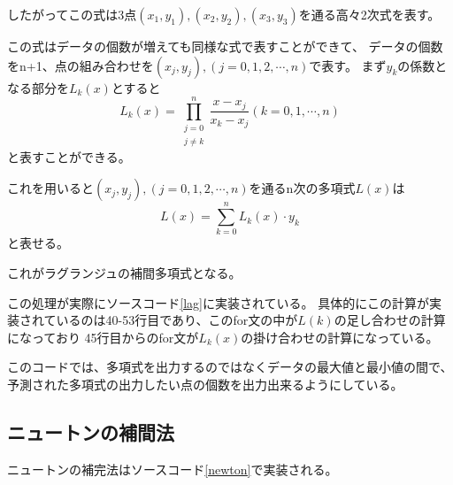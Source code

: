\documentclass[a4paper,11pt,dvipdfmx]{jsarticle}
\begin{document}
したがってこの式は3点$(x_1,y_1),(x_2,y_2),(x_3,y_3)$を通る高々2次式を表す。

この式はデータの個数が増えても同様な式で表すことができて、
データの個数をn+1、点の組み合わせを$(x_j,y_j),(j=0,1,2,\cdots,n)$で表す。
まず$y_k$の係数となる部分を$L_k(x)$とすると
\begin{equation*}
    L_k(x) = \prod_{\substack{j=0 \\ j \neq k}}^{n} \frac{x-x_j}{x_k-x_j} (k=0,1,\cdots,n)
\end{equation*}
と表すことができる。

これを用いると$(x_j,y_j),(j=0,1,2,\cdots,n)$を通るn次の多項式$L(x)$は
\begin{equation*}
    L(x) = \sum_{k=0}^{n} L_k(x) \cdot y_k
\end{equation*}
と表せる。

これがラグランジュの補間多項式となる。

この処理が実際にソースコード\ref{lag}に実装されている。
具体的にこの計算が実装されているのは40-53行目であり、このfor文の中が$L(k)$の足し合わせの計算になっており
45行目からのfor文が$L_k(x)$の掛け合わせの計算になっている。

このコードでは、多項式を出力するのではなくデータの最大値と最小値の間で、
予測された多項式の出力したい点の個数を出力出来るようにしている。

\subsection{ニュートンの補間法}
ニュートンの補完法はソースコード\ref{newton}で実装される。

\end{document}
